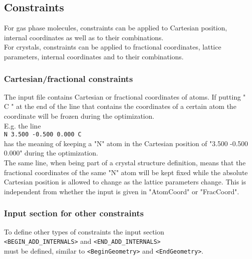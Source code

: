 \documentclass[prl,aps,preprint,superbib,12pt]{revtex4}
\begin{document}
\subsection{Constraints}

For gas phase molecules, constraints can be applied to 
Cartesian position, internal coordinates as well as to their 
combinations.
\\
For crystals, constraints can be applied to fractional coordinates,
lattice parameters, internal coordinates and to their combinations.

\subsubsection{Cartesian/fractional constraints}
The input file contains Cartesian or fractional coordinates of atoms.
If putting " C " at the end of the line that contains the coordinates
of a certain atom the coordinate will be frozen during the optimization.
\\
E.g. the line
\\
{\tt N    3.500  -0.500   0.000 C}
\\
has the meaning of keeping a "N" atom in the Cartesian position
of "3.500  -0.500   0.000" during the optimization. 
\\
The same line, when
being part of a crystal structure definition, means that
the fractional coordinates of the same "N" atom will be kept fixed
while the absolute Cartesian position is allowed to change as the 
lattice parameters change. This is independent from whether 
the input is given in "AtomCoord" or "FracCoord".

\subsubsection{Input section for other constraints}
To define other types of constraints the input section
\\
{\tt <BEGIN\_ADD\_INTERNALS>} and {\tt <END\_ADD\_INTERNALS>}
\\
must be defined, similar to {\tt <BeginGeometry>} and
{\tt <EndGeometry>}.
\end{document}
